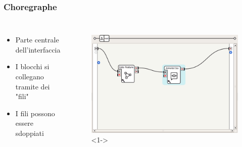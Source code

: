 \documentclass[aspectratio=169]{beamer}
\begin{document}
\begin{frame}
\frametitle{Choregraphe}
\begin{columns}
		\begin{itemize}
			\item<1-> Parte centrale dell'interfaccia
			\item<2-> I blocchi si collegano tramite dei "fili"
			\item<3-> I fili possono essere sdoppiati
		\end{itemize}
		\begin{figure}[ht]
		\begin{center}
		\includegraphics[width=1\textwidth]{blocks}<1->
		\end{center}
		\end{figure}
\end{columns}
\end{frame}
\end{document}
